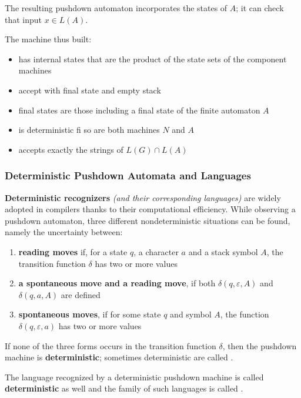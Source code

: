 \documentclass[english]{article}
\begin{document}
The resulting pushdown automaton incorporates the states of \(A\);
it can check that input \(x \in L(A)\).

The machine thus built:

\begin{itemize}
  \item has internal states that are the product of the state sets of the component machines
  \item accept with final state and empty stack
  \item final states are those including a final state of the finite automaton \(A\)
  \item is deterministic fi so are both machines \(N\) and \(A\)
  \item accepts exactly the strings of \(L(G) \cap L(A)\)
\end{itemize}

\subsubsection{Deterministic Pushdown Automata and Languages}

\textbf{Deterministic recognizers} \textit{(and their corresponding languages)} are widely adopted in compilers thanks to their computational efficiency.
While observing a pushdown automaton, three different nondeterministic situations can be found, namely the uncertainty between:

\begin{enumerate}
  \item \textbf{reading moves} if, for a state \(q\), a character \(a\) and a stack symbol \(A\), the transition function \(\delta\) has two or more values
  \item \textbf{a spontaneous move and a reading move}, if both \(\delta(q, \varepsilon, A)\) and \(\delta(q, a, A)\) are defined
  \item \textbf{spontaneous moves}, if for some state \(q\) and symbol \(A\), the function \(\delta(q, \varepsilon, a)\) has two or more values
\end{enumerate}

If none of the three forms occurs in the transition function \(\delta\), then the pushdown machine is \textbf{deterministic};
sometimes deterministic \PDA are called \DPDA.

The language recognized by a deterministic pushdown machine is called \textbf{deterministic} as well and the family of such languages is called \DET.
\end{document}
